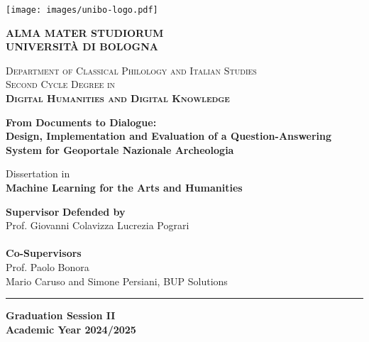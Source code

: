 \documentclass[a4paper,12pt, openany]{book}  %
\begin{document}
\begin{titlepage}
    \centering
    \texttt{[image: images/unibo-logo.pdf]}
    
    \vspace*{1cm}
    \Large
    \textbf{ALMA MATER STUDIORUM \\ 
    UNIVERSITÀ DI BOLOGNA}
    
    
    \vspace{1.5cm}
    
    \normalsize
    \textsc{Department of Classical Philology and Italian Studies} \\
    \vspace{0.5cm}
    \textsc{Second Cycle Degree in} \\
    \vspace{0.2cm}
    \textsc{\textbf{Digital Humanities and Digital Knowledge}}
    
    \vspace{1.6cm}
    
    \begin{spacing}{1}
    \LARGE
    \textbf{From Documents to Dialogue:\\Design, Implementation and Evaluation of a Question-Answering System for Geoportale Nazionale Archeologia}
    \end{spacing}
    
    \vspace{1.2cm}
    \normalsize
    Dissertation in\\
    \textbf{Machine Learning for the Arts and Humanities}
    
    \vspace{1cm}
    
    \begin{tabbing}
    \textbf{Supervisor} \hspace{10cm} \= \textbf{Defended by} \\
    Prof. Giovanni Colavizza \> Lucrezia Pograri \\
    \\
    \textbf{Co-Supervisors}\\
    Prof. Paolo Bonora \\
    Mario Caruso and Simone Persiani, BUP Solutions
    \end{tabbing}
    
    \vfill
    \rule{\linewidth}{0.4pt}
    \vspace{0.2cm}
    
    \textbf{Graduation Session II} \\
    \textbf{Academic Year 2024/2025}
    
\end{titlepage}
\newpage
\thispagestyle{empty}  %
\mbox{}                %
\setcounter{figure}{0}
\end{document}
